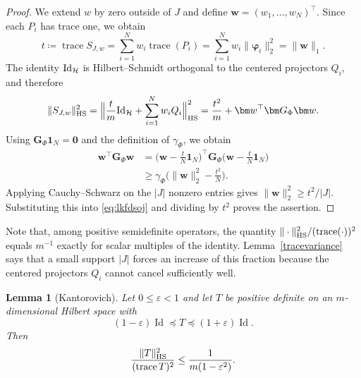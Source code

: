 \documentclass[a4paper]{amsart}
\numberwithin{equation}{section}
\newtheorem{lemma}[theorem]{Lemma}
\DeclareMathOperator{\trace}{trace}
\DeclareMathOperator{\Id}{Id}
\begin{document}
\begin{proof}
    We extend $w$ by zero outside of $J$ and define $\bm w = (w_1,\dots,w_N)^\top$.
    Since each $P_i$ has trace one, we obtain
    \begin{equation*}
        t 
        \coloneqq \trace S_{J,w}
        = \sum_{i=1}^{N} w_i \trace(P_i)
        = \sum_{i=1}^{N} w_i \| \bm\varphi_i \|_2^2
        = \|\bm w\|_1 .
    \end{equation*}
    The identity ${\rm Id}_{\mathcal H}$ is Hilbert--Schmidt orthogonal to the centered projectors $Q_i$, and therefore
    \begin{equation}\label{eq:lkfdsoj}
        \|S_{J,w}\|_{\rm HS}^2
        = \Big\| \frac tm {\rm Id}_{\mathcal H} + \sum_{i=1}^{N} w_i Q_i \Big\|_{\rm HS}^2
        = \frac{t^2}{m} + \bm w^\top\bm G_\Phi\bm w .
    \end{equation}
    Using $\bm G_\Phi\bm 1_N = \bm 0$ and the definition of $\gamma_\Phi$, we obtain
    \begin{align*}
        \bm w^\top\bm G_\Phi\bm w
        &= \Big(\bm w-\frac tN\bm 1_N\Big)^\top \bm G_\Phi \Big(\bm w-\frac tN\bm 1_N\Big) \\
        &\ge \gamma_\Phi \Big(\|\bm w\|_2^2-\frac{t^2}{N}\Big) .
    \end{align*}
    Applying Cauchy--Schwarz on the $|J|$ nonzero entries gives $\|\bm w\|_2^2 \ge t^2/|J|$.
    Substituting this into \eqref{eq:lkfdsoj} and dividing by $t^2$ proves the assertion.
\end{proof}

Note that, among positive semidefinite operators, the quantity $\|\cdot\|_{\rm HS}^2/(\trace(\cdot))^2$ equals $m^{-1}$ exactly for scalar multiples of the identity.
Lemma~\ref{tracevariance} says that a small support $|J|$ forces an increase of this fraction because the centered projectors $Q_i$ cannot cancel sufficiently well.

\begin{lemma}[Kantorovich]\label{kantorovich}
    Let $0\le\varepsilon<1$ and let $T$ be positive definite on an $m$-dimensional Hilbert space with
    \begin{equation*}
        (1-\varepsilon)\Id
        \preceq T
        \preceq (1+\varepsilon)\Id.
    \end{equation*}
    Then
    \begin{equation*}
        \frac{\|T\|_{\rm HS}^2}{(\trace T)^2}
        \le \frac{1}{m(1-\varepsilon^2)} .
    \end{equation*}
\end{lemma}
\end{document}
